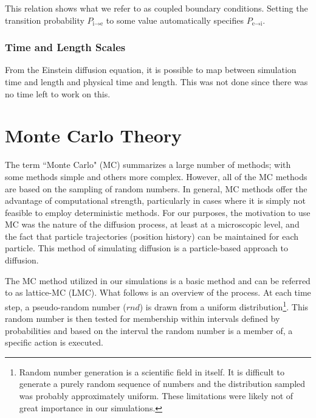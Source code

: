 	This relation shows what we refer to as coupled boundary conditions. Setting the transition probability $ P_{\textrm{i} \rightarrow \textrm{e}}$ to some value automatically specifies $ P_{\textrm{e} \rightarrow \textrm{i}} $.

\subsubsection{Time and Length Scales}

	From the Einstein diffusion equation, it is possible to map between simulation time and length and physical time and length. This was not done since there was no time left to work on this.

\clearpage
\section{Monte Carlo Theory}
\label{sec:intro-mc}
	
	The term ``Monte Carlo" (MC) summarizes a large number of methods; with some methods simple and others more complex. However, all of the MC methods are based on the sampling of random numbers. In general, MC methods offer the advantage of computational strength, particularly in cases where it is simply not feasible to employ deterministic methods. For our purposes, the motivation to use MC was the nature of the diffusion process, at least at a microscopic level, and the fact that particle trajectories (position history) can be maintained for each particle. This method of simulating diffusion is a particle-based approach to diffusion.
	
	The MC method utilized in our simulations is a basic method and can be referred to as lattice-MC (LMC).  What follows is an overview of the process. At each time step, a pseudo-random number ($ rnd $) is drawn from a uniform distribution\footnote{Random number generation is a scientific field in itself. It is difficult to generate a purely random sequence of numbers and the distribution sampled was probably approximately uniform. These limitations were likely not of great importance in our simulations.}. This random number is then tested for membership within intervals defined by probabilities and based on the interval the random number is a member of, a specific action is executed.
	
